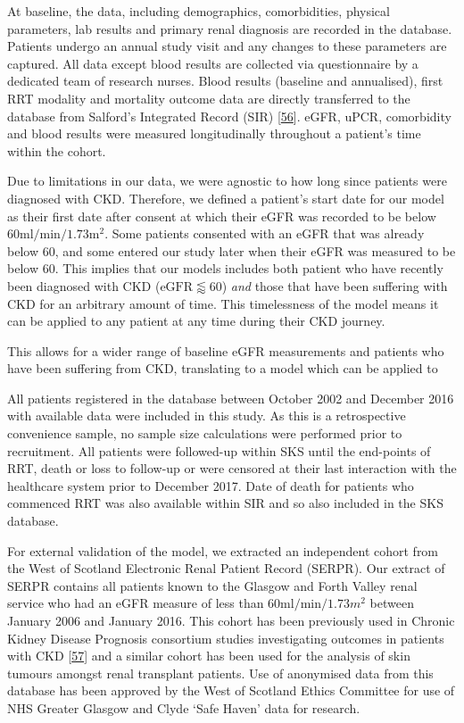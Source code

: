 \documentclass[
]{article}
\begin{document}
At baseline, the data, including demographics, comorbidities, physical parameters, lab results and primary renal diagnosis are recorded in the database. Patients undergo an annual study visit and any changes to these parameters are captured. All data except blood results are collected via questionnaire by a dedicated team of research nurses. Blood results (baseline and annualised), first RRT modality and mortality outcome data are directly transferred to the database from Salford's Integrated Record (SIR) {[}\protect\hyperlink{ref-new_obtaining_2014}{56}{]}. eGFR, uPCR, comorbidity and blood results were measured longitudinally throughout a patient's time within the cohort.

Due to limitations in our data, we were agnostic to how long since patients were diagnosed with CKD. Therefore, we defined a patient's start date for our model as their first date after consent at which their eGFR was recorded to be below \(60\textrm{ml}/\textrm{min}/1.73\textrm{m}^2\). Some patients consented with an eGFR that was already below 60, and some entered our study later when their eGFR was measured to be below 60. This implies that our models includes both patient who have recently been diagnosed with CKD (\(\textrm{eGFR} \lessapprox 60\)) \emph{and} those that have been suffering with CKD for an arbitrary amount of time. This timelessness of the model means it can be applied to any patient at any time during their CKD journey.

This allows for a wider range of baseline eGFR measurements and patients who have been suffering from CKD, translating to a model which can be applied to

All patients registered in the database between October 2002 and December 2016 with available data were included in this study. As this is a retrospective convenience sample, no sample size calculations were performed prior to recruitment. All patients were followed-up within SKS until the end-points of RRT, death or loss to follow-up or were censored at their last interaction with the healthcare system prior to December 2017. Date of death for patients who commenced RRT was also available within SIR and so also included in the SKS database.

For external validation of the model, we extracted an independent cohort from the West of Scotland Electronic Renal Patient Record (SERPR). Our extract of SERPR contains all patients known to the Glasgow and Forth Valley renal service who had an eGFR measure of less than \(60\textrm{ml}/\textrm{min}/1.73m^2\) between January 2006 and January 2016. This cohort has been previously used in Chronic Kidney Disease Prognosis consortium studies investigating outcomes in patients with CKD {[}\protect\hyperlink{ref-matsushita_cohort_2013}{57}{]} and a similar cohort has been used for the analysis of skin tumours amongst renal transplant patients. Use of anonymised data from this database has been approved by the West of Scotland Ethics Committee for use of NHS Greater Glasgow and Clyde `Safe Haven' data for research.
\end{document}
